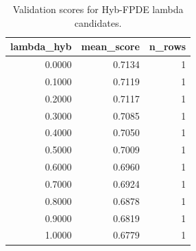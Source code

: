 \begin{table}[t]
\caption{Validation scores for Hyb-FPDE lambda candidates.}
\label{tab:lambda_distribution_computed}
\centering
\begin{tabular}{rrr}
\toprule
lambda\_hyb & mean\_score & n\_rows \\
\midrule
0.0000 & 0.7134 & 1 \\
0.1000 & 0.7119 & 1 \\
0.2000 & 0.7117 & 1 \\
0.3000 & 0.7085 & 1 \\
0.4000 & 0.7050 & 1 \\
0.5000 & 0.7009 & 1 \\
0.6000 & 0.6960 & 1 \\
0.7000 & 0.6924 & 1 \\
0.8000 & 0.6878 & 1 \\
0.9000 & 0.6819 & 1 \\
1.0000 & 0.6779 & 1 \\
\bottomrule
\end{tabular}

\end{table}
